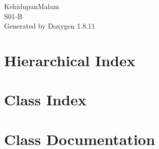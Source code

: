 \documentclass[twoside]{book}
\newcommand{\+}{\discretionary{\mbox{\scriptsize$\hookleftarrow$}}{}{}}
\newcommand{\clearemptydoublepage}{%
  \newpage{\pagestyle{empty}\cleardoublepage}%
}
\begin{document}
\hypersetup{pageanchor=false,
             bookmarksnumbered=true,
             pdfencoding=unicode
            }
\begin{titlepage}
\vspace*{7cm}
\begin{center}%
{\Large Kehidupan\+Malam \\[1ex]\large S01-\/B }\\
\vspace*{1cm}
{\large Generated by Doxygen 1.8.11}\\
\end{center}
\end{titlepage}
\clearemptydoublepage
\tableofcontents
\clearemptydoublepage
{}
\hypersetup{pageanchor=true}

\chapter{Hierarchical Index}

\chapter{Class Index}

\chapter{Class Documentation}

























\backmatter
\newpage
{}
\clearemptydoublepage
{}
\printindex
\end{document}
